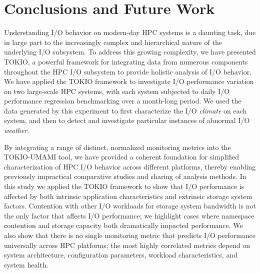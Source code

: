 \section{Conclusions and Future Work} \label{sec:conclusions}

Understanding I/O behavior on modern-day HPC systems is a daunting task, due in large part to the increasingly complex and hierarchical nature of the underlying I/O subsystem.
To address this growing complexity, we have presented TOKIO, a powerful framework for integrating data from numerous components throughout the HPC I/O subsystem to provide holistic analysis of I/O behavior.
We have applied the TOKIO framework to investigate I/O performance variation on two large-scale HPC systems, with each system subjected to daily I/O performance regression benchmarking over a month-long period.
We used the data generated by this experiment to first characterize the I/O \emph{climate} on each system, and then to detect and investigate particular instances of abnormal I/O \emph{weather}.

By integrating a range of distinct, normalized monitoring metrics into the
TOKIO-UMAMI tool, we have provided a coherent foundation for simplified
characterization of HPC I/O behavior across different platforms, thereby
enabling previously impractical comparative studies and sharing of analysis
methods. 
In this study we applied the TOKIO framework to show that I/O performance is affected by both intrinsic application characteristics and extrinsic storage system factors. Contention with other I/O workloads for storage system bandwidth is not the only factor that affects I/O performance; %
we highlight cases  where namespace contention and storage capacity both dramatically impacted performance.
We also show that there is no single monitoring metric that predicts I/O performance
universally across HPC platforms; the most highly correlated metrics depend
on system architecture, configuration parameters, workload characteristics,
and system health.

